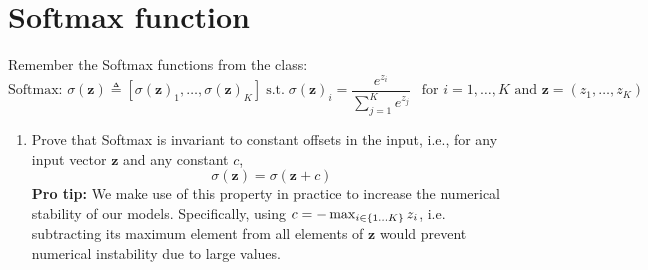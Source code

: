 
\section{Softmax function}
\label{sec:softmax}
Remember  the Softmax functions from the class: 
$$
    \text{Softmax: } \sigma(\mathbf{z}) \triangleq [\sigma(\mathbf{z})_1, \hdots, \sigma(\mathbf{z})_K] \; \text{s.t.} \;  \sigma(\mathbf{z})_i = \frac{e^{z_i}}{\sum_{j=1}^K e^{z_j}} \ \ \text{ for } i = 1, \dotsc, K \text{ and } \mathbf{z} = (z_1, \dotsc, z_K)
$$

\begin{enumerate}
    \item  Prove that Softmax is invariant to constant offsets in the input, i.e., for any input vector \label{subsec:5.1}
    $\mathbf{z}$ and any constant $c$,
    $$
        \sigma(\mathbf{z}) = \sigma(\mathbf{z} + c) 
    $$
    \textbf{Pro tip: } We make use of this property in practice to increase the numerical stability of our models. 
    Specifically, using  $c = - \max_{i \in \left\lbrace 1 ... K \right\rbrace} z_i$, i.e. subtracting its maximum element from all elements of $\mathbf{z}$ would prevent numerical instability  due to large values. \\
    

\end{enumerate}
